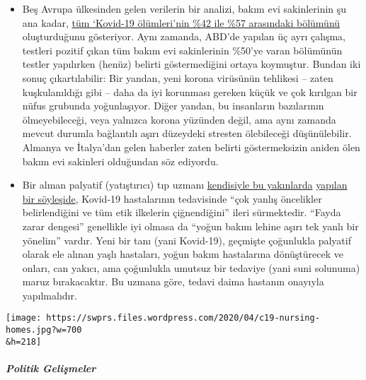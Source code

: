 \begin{itemize}
\tightlist
\item
  Beş Avrupa ülkesinden gelen verilerin bir analizi, bakım evi
  sakinlerinin şu ana kadar,
  \href{https://ltccovid.org/2020/04/12/mortality-associated-with-covid-19-outbreaks-in-care-homes-early-international-evidence/}{tüm
  `Kovid-19 ölümleri'nin \%42 ile \%57 arasındaki bölümünü}
  oluşturduğunu gösteriyor. Aynı zamanda, ABD'de yapılan üç ayrı
  çalışma, testleri pozitif çıkan tüm bakım evi sakinlerinin \%50'ye
  varan bölümünün testler yapılırken (henüz) belirti göstermediğini
  ortaya koymuştur. Bundan iki sonuç çıkartılabilir: Bir yandan, yeni
  korona virüsünün tehlikesi -- zaten kuşkulanıldığı gibi -- daha da iyi
  korunması gereken küçük ve çok kırılgan bir nüfus grubunda
  yoğunlaşıyor. Diğer yandan, bu insanların bazılarının ölmeyebileceği,
  veya yalnızca korona yüzünden değil, ama aynı zamanda mevcut durumla
  bağlantılı aşırı düzeydeki stresten ölebileceği düşünülebilir. Almanya
  ve İtalya'dan gelen haberler zaten belirti göstermeksizin aniden ölen
  bakım evi sakinleri olduğundan söz ediyordu.
\item
  Bir alman palyatif (yatıştırıcı) tıp uzmanı
  \href{https://www.deutschlandfunk.de/palliativmediziner-zu-covid-19-behandlungen-sehr-falsche.694.de.html?dram:article_id=474488}{kendisiyle
  bu yakınlarda}
  \href{https://www.deutschlandfunk.de/palliativmediziner-zu-covid-19-behandlungen-sehr-falsche.694.de.html?dram:article_id=474488}{yapılan
  bir söyleşide}, Kovid-19 hastalarının tedavisinde ``çok yanlış
  öncelikler belirlendiğini ve tüm etik ilkelerin çiğnendiğini'' ileri
  sürmektedir. ``Fayda zarar dengesi'' genellikle iyi olmasa da ``yoğun
  bakım lehine aşırı tek yanlı bir yönelim'' vardır. Yeni bir tanı (yani
  Kovid-19), geçmişte çoğunlukla palyatif olarak ele alınan yaşlı
  hastaları, yoğun bakım hastalarına dönüştürecek ve onları, can yakıcı,
  ama çoğunlukla umutsuz bir tedaviye (yani suni solunuma) maruz
  bırakacaktır. Bu uzmana göre, tedavi daima hastanın onayıyla
  yapılmalıdır.
\end{itemize}

\texttt{[image: https://swprs.files.wordpress.com/2020/04/c19-nursing-homes.jpg?w=700\\\&h=218]}

\hypertarget{politik-geliux15fmeler}{%
\subparagraph{\texorpdfstring{\textbf{Politik
Gelişmeler}}{Politik Gelişmeler}}\label{politik-geliux15fmeler}}

